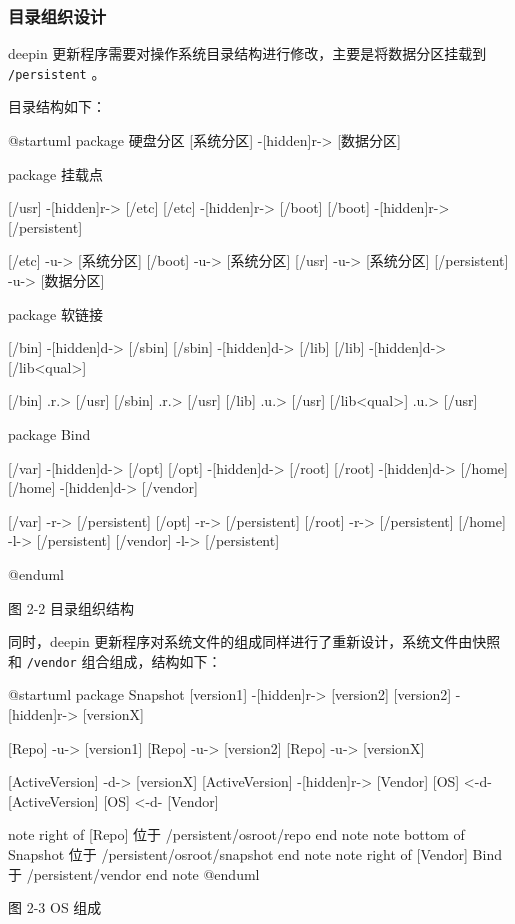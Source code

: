 \documentclass{utart}
\begin{document}
\subsubsection{目录组织设计}
deepin 更新程序需要对操作系统目录结构进行修改，主要是将数据分区挂载到 \texttt{/persistent} 。

目录结构如下：
\begin{center}
  \begin{adjustbox}{scale=0.65}
    \begin{plantuml}
      @startuml
      package 硬盘分区 {
        [系统分区] -[hidden]r-> [数据分区]
      }

      package 挂载点 {
        [/usr] -[hidden]r-> [/etc]
        [/etc] -[hidden]r-> [/boot]
        [/boot] -[hidden]r-> [/persistent]

        [/etc] -u-> [系统分区]
        [/boot] -u-> [系统分区]
        [/usr] -u-> [系统分区]
        [/persistent] -u-> [数据分区]
      }

      package 软链接 {
        [/bin] -[hidden]d-> [/sbin]
        [/sbin] -[hidden]d-> [/lib]
        [/lib] -[hidden]d-> [/lib<qual>]

        [/bin] .r.> [/usr]
        [/sbin] .r.> [/usr]
        [/lib] .u.> [/usr]
        [/lib<qual>] .u.> [/usr]
      }

      package Bind {
        [/var] -[hidden]d-> [/opt]
        [/opt] -[hidden]d-> [/root]
        [/root] -[hidden]d-> [/home]
        [/home] -[hidden]d-> [/vendor]

        [/var] -r-> [/persistent]
        [/opt] -r-> [/persistent]
        [/root] -r-> [/persistent]
        [/home] -l-> [/persistent]
        [/vendor] -l-> [/persistent]
      }
      @enduml
    \end{plantuml}
  \end{adjustbox}

  图 2-2 目录组织结构
\end{center}

同时，deepin 更新程序对系统文件的组成同样进行了重新设计，系统文件由快照和 \texttt{/vendor} 组合组成，结构如下：
\begin{center}
  \begin{adjustbox}{scale=0.75}
    \begin{plantuml}
      @startuml
      package Snapshot {
        [version1] -[hidden]r-> [version2]
        [version2] -[hidden]r-> [versionX]
      }

      [Repo] -u-> [version1]
      [Repo] -u-> [version2]
      [Repo] -u-> [versionX]

      [ActiveVersion] -d-> [versionX]
      [ActiveVersion] -[hidden]r-> [Vendor]
      [OS] <-d- [ActiveVersion]
      [OS] <-d- [Vendor]

      note right of [Repo]
      位于 /persistent/osroot/repo
      end note
      note bottom of Snapshot
      位于 /persistent/osroot/snapshot
      end note
      note right of [Vendor]
      Bind于 /persistent/vendor
      end note
      @enduml
    \end{plantuml}
  \end{adjustbox}

  图 2-3 OS 组成
\end{center}
\end{document}
